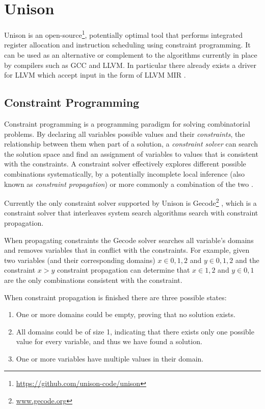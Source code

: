 \section{Unison}
\label{sec:unison}

Unison is an open-source\footnote{\url{https://github.com/unison-code/unison}},
potentially optimal tool that performs integrated register allocation and instruction
scheduling using constraint programming. It can be used as an alternative or complement to
the algorithms currently in place by compilers such as GCC and LLVM. In particular there
already exists a driver for LLVM which accept input in the form of LLVM MIR \cite{unison-docs}.

\subsection{Constraint Programming}

Constraint programming is a programming paradigm for solving combinatorial problems.
By declaring all variables possible values and their \textit{constraints}, the relationship
between them when part of a solution, a \textit{constraint solver} can search the solution
space and find an assignment of variables to values that is consistent with the constraints.
A constraint solver effectively explores different possible combinations systematically,
by a potentially incomplete local inference (also known as \textit{constraint propagation})
or more commonly a combination of the two \cite{handbook-constraint-programming}.

Currently the only constraint solver supported by Unison is Gecode\footnote{\url{www.gecode.org}}
\cite{unison-docs}, which is a constraint solver that interleaves system search algorithms
search with constraint propagation\cite{MPG}.

When propagating constraints the Gecode solver searches all variable's domains and removes
variables that in conflict with the constraints\cite[Section~23.1]{MPG}. For example,
given two variables (and their corresponding domains) $x \in {0,1,2}$ and $y \in {0,1,2}$
and the constraint $x > y$ constraint propagation can determine that $x \in {1, 2}$ and
$y \in {0, 1}$ are the only combinations consistent with the constraint.

When constraint propagation is finished there are three possible states:

\begin{enumerate}
	\item One or more domains could be empty, proving that no solution exists.
	\item	All domains could be of size 1, indicating that there exists only one possible
		value for every variable, and thus we have found a solution.
	\item One or more variables have multiple values in their domain.
\end{enumerate}

